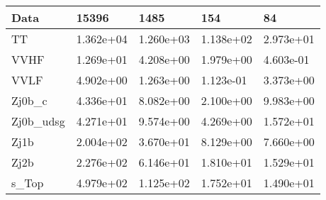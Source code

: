 \begin{table}
{\begin{tabularx}{\textwidth}{|X|X|X|X|X|}
\hline
Data & 15396 & 1485 & 154 & 84 \\
\hline
TT & 1.362e+04 & 1.260e+03 & 1.138e+02 & 2.973e+01 \\
VVHF & 1.269e+01 & 4.208e+00 & 1.979e+00 & 4.603e-01 \\
VVLF & 4.902e+00 & 1.263e+00 & 1.123e-01 & 3.373e+00 \\
Zj0b\_c & 4.336e+01 & 8.082e+00 & 2.100e+00 & 9.983e+00 \\
Zj0b\_udsg & 4.271e+01 & 9.574e+00 & 4.269e+00 & 1.572e+01 \\
Zj1b & 2.004e+02 & 3.670e+01 & 8.129e+00 & 7.660e+00 \\
Zj2b & 2.276e+02 & 6.146e+01 & 1.810e+01 & 1.529e+01 \\
s\_Top & 4.979e+02 & 1.125e+02 & 1.752e+01 & 1.490e+01 \\
\hline
\end{tabularx}
}
\label{tab:cr-Zmm-2016}
\end{table}

